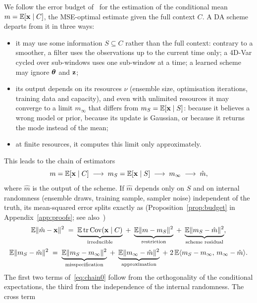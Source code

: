 We follow the error budget of~\cite{fablet_not_2026} for the estimation of the conditional
mean $m = \mathbb{E}[\mathbf{x} \mid C]$, the MSE-optimal estimate given the full context $C$. A DA scheme
departs from it in three ways:
\begin{itemize}
\item it may use some information $S \subseteq C$ rather than the full context: contrary to
  a smoother, a filter uses the observations up to the current time only; a 4D-Var cycled
  over sub-windows uses one sub-window at a time; a learned scheme may ignore $\boldsymbol{\theta}$ and
  $\mathbf{z}$;
\item its output depends on its resources $\nu$ (ensemble size, optimisation iterations,
  training data and capacity), and even with unlimited resources it may converge to a
  limit $m_\infty$ that differs from $m_S = \mathbb{E}[\mathbf{x} \mid S]$: because it believes a wrong
  model or prior, because its update is Gaussian, or because it returns the mode instead of
  the mean;
\item at finite resources, it computes this limit only approximately.
\end{itemize}
This leads to the chain of estimators
\begin{equation}\label{eq:chain}
  m = \mathbb{E}[\mathbf{x}\mid C] \;\longrightarrow\; m_S = \mathbb{E}[\mathbf{x}\mid S]
  \;\longrightarrow\; m_\infty \;\longrightarrow\; \hat m ,
\end{equation}
where $\hat m$ is the output of the scheme. If $\hat m$ depends only on $S$ and on internal
randomness (ensemble draws, training sample, sampler noise) independent of the truth, its
mean-squared error splits exactly as (Proposition~\ref{prop:budget} in Appendix~\ref{app:proofs}; see also~\cite{fablet_not_2026})
\begin{equation}\label{eq:chain0}
  \mathbb{E} \|\hat m - \mathbf{x}\|^2 \;=\;
  \underbrace{\mathbb{E}\operatorname{tr}\operatorname{Cov}(\mathbf{x}\mid C)}_{\text{irreducible}}
  \;+\; \underbrace{\mathbb{E}\|m - m_S\|^2}_{\text{restriction}}
  \;+\; \underbrace{\mathbb{E}\|m_S - \hat m\|^2}_{\text{scheme residual}},
\end{equation}
\begin{equation}\label{eq:residual}
  \mathbb{E}\|m_S - \hat m\|^2 \;=\;
  \underbrace{\mathbb{E}\|m_S - m_\infty\|^2}_{\text{misspecification}}
  \;+\; \underbrace{\mathbb{E}\|m_\infty - \hat m\|^2}_{\text{approximation}}
  \;+\; 2\,\mathbb{E}\langle m_S - m_\infty,\, m_\infty - \hat m\rangle .
\end{equation}
The first two terms of~\eqref{eq:chain0} follow from the orthogonality of the conditional
expectations, the third from the independence of the internal randomness. The cross term
